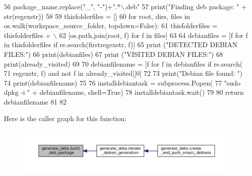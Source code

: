 \begin{DoxyCode}
56         package\_name.replace(\textcolor{stringliteral}{"\_"}, \textcolor{stringliteral}{"-"})+\textcolor{stringliteral}{".*\(\backslash\).deb"}
57     print(\textcolor{stringliteral}{"Finding deb package: "} + str(regexstr))
58 
59     thisfolderfiles = []
60     \textcolor{keywordflow}{for} root, dirs, files \textcolor{keywordflow}{in} os.walk(workspace\_source\_folder, topdown=\textcolor{keyword}{False}):
61         thisfolderfiles = thisfolderfiles + \(\backslash\)
62             [os.path.join(root, f) \textcolor{keywordflow}{for} f \textcolor{keywordflow}{in} files]
63 
64     debianfiles = [f \textcolor{keywordflow}{for} f \textcolor{keywordflow}{in} thisfolderfiles \textcolor{keywordflow}{if} re.search(firstregexstr, f)]
65     \textcolor{keywordflow}{print} (\textcolor{stringliteral}{"DETECTED DEBIAN FILES:"})
66     print(debianfiles)
67     \textcolor{keywordflow}{print} (\textcolor{stringliteral}{"VISITED DEBIAN FILES:"})
68     print(already\_visited)
69 
70     debianfilename = [f \textcolor{keywordflow}{for} f \textcolor{keywordflow}{in} debianfiles \textcolor{keywordflow}{if} re.search(
71         regexstr, f) \textcolor{keywordflow}{and} \textcolor{keywordflow}{not} f \textcolor{keywordflow}{in} already\_visited][0]
72 
73     print(\textcolor{stringliteral}{"Debian file found: "})
74     print(debianfilename)
75 
76     installdebiantask = subprocess.Popen(
77         \textcolor{stringliteral}{"sudo dpkg -i "} + debianfilename, shell=\textcolor{keyword}{True})
78     installdebiantask.wait()
79 
80     \textcolor{keywordflow}{return} debianfilename
81 
82 
\end{DoxyCode}
Here is the caller graph for this function\+:
\nopagebreak
\begin{figure}[H]
\begin{center}
\leavevmode
\includegraphics[width=350pt]{namespacegenerate__debs_aa70c3f4917ddc57b13eaed8501f571a8_icgraph}
\end{center}
\end{figure}
\mbox{\label{namespacegenerate__debs_af7237c463c8e5b4df369e6befc154c50}} 
